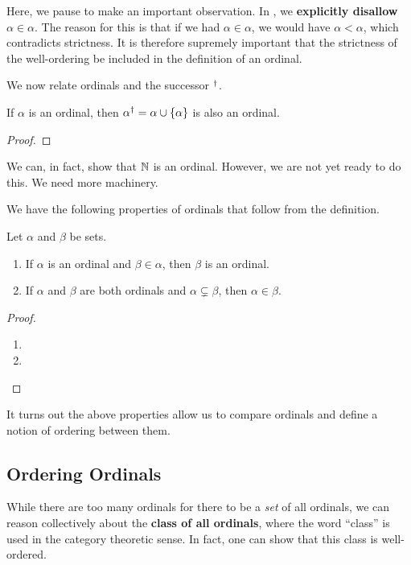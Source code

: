 Here, we pause to make an important observation. In , we \textbf{explicitly disallow $\alpha \in \alpha$}. The reason for this is that if we had $\alpha \in \alpha$, we would have $\alpha < \alpha$, which contradicts strictness. It is therefore supremely important that the strictness of the well-ordering be included in the definition of an ordinal.

We now relate ordinals and the successor $^{\dagger}$.

\begin{boxlemma}
    If $\alpha$ is an ordinal, then $\alpha^{\dagger} = \alpha \cup \left\{ \alpha \right\}$ is also an ordinal.
\end{boxlemma}
\begin{proof}
    \sorry
\end{proof}

We can, in fact, show that $\mathbb{N}$ is an ordinal. However, we are not yet ready to do this. We need more machinery.

We have the following properties of ordinals that follow from the definition.

\begin{boxproposition}
    Let $\alpha$ and $\beta$ be sets.
    \begin{enumerate}
        \item If $\alpha$ is an ordinal and $\beta \in \alpha$, then $\beta$ is an ordinal.
        \item If $\alpha$ and $\beta$ are both ordinals and $\alpha \subsetneq \beta$, then $\alpha \in \beta$.
    \end{enumerate}
\end{boxproposition}
\begin{proof}\hfill
    \begin{enumerate}
        \item \sorry

        \item \sorry
    \end{enumerate}
\end{proof}

It turns out the above properties allow us to compare ordinals and define a notion of ordering between them.

\subsection{Ordering Ordinals}

While there are too many ordinals for there to be a \textit{set} of all ordinals, we can reason collectively about the \textbf{class of all ordinals}, where the word ``class'' is used in the category theoretic sense.  In fact, one can show that this class is well-ordered.

